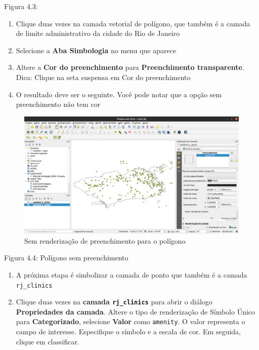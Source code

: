 \documentclass[
]{krantz}
\providecommand{\tightlist}{%
  \setlength{\itemsep}{0pt}\setlength{\parskip}{0pt}}
\begin{document}
Figura 4.3:

\begin{enumerate}
\def\labelenumi{\arabic{enumi}.}
\setcounter{enumi}{3}
\tightlist
\item
  Clique duas vezes na camada vetorial de polígono, que também é a camada de limite administrativo da cidade do Rio de Janeiro
\item
  Selecione a \textbf{Aba Simbologia} no menu que aparece
\item
  Altere a \textbf{Cor do preenchimento} para \textbf{Preenchimento transparente}. Dica: Clique na seta suspensa em Cor do preenchimento
\item
  O resultado deve ser o seguinte. Você pode notar que a opção sem preenchimento não tem cor
\end{enumerate}

\begin{figure}
\centering
\includegraphics{media/modulo4/no-fill-render.png}
\caption{Sem renderização de preenchimento para o polígono}
\end{figure}

Figura 4.4: Polígono sem preenchimento

\begin{enumerate}
\def\labelenumi{\arabic{enumi}.}
\setcounter{enumi}{7}
\tightlist
\item
  A próxima etapa é simbolizar a camada de ponto que também é a camada \texttt{rj\_clinics}
\item
  Clique duas vezes na \textbf{camada \texttt{rj\_clinics}} para abrir o diálogo \textbf{Propriedades da camada}. Altere o tipo de renderização de Símbolo Único para \textbf{Categorizado}, selecione \textbf{Valor} como \texttt{amenity}. O valor representa o campo de interesse. Especifique o símbolo e a escala de cor. Em seguida, clique em classificar.
\end{enumerate}
\end{document}
